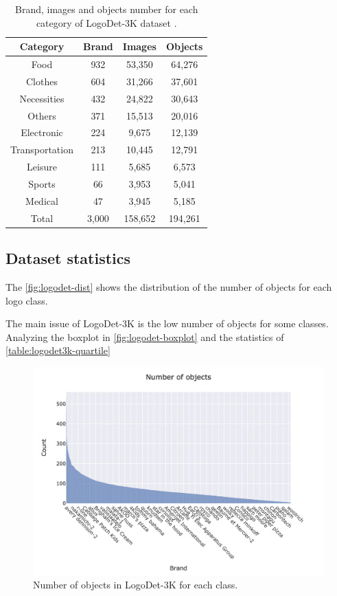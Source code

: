 \begin{table}
    \centering
    \begin{tabular}{c | c  c  c } 
     \hline
     \textbf{Category} & \textbf{Brand} & \textbf{Images} & \textbf{Objects} \\
     \hline
     Food & 932 & 53,350 & 64,276 \\ 
    Clothes & 604 & 31,266 & 37,601 \\ 
    Necessities & 432 & 24,822 & 30,643 \\ 
    Others & 371 & 15,513 & 20,016 \\ 
    Electronic & 224 & 9,675 & 12,139 \\ 
    Transportation & 213 & 10,445 & 12,791 \\ 
    Leisure & 111 & 5,685 & 6,573 \\ 
    Sports & 66 & 3,953 & 5,041 \\ 
    Medical & 47 & 3,945 & 5,185 \\ 
    \hline
    Total & 3,000 & 158,652 & 194,261 \\ 

    \end{tabular}
    \caption{Brand, images and objects number for each category of LogoDet-3K dataset \cite{wang2022logodet}.}
    \label{table:logodet3k-category-statistics}
\end{table}

\subsection{Dataset statistics}
The \autoref{fig:logodet-dist} shows the distribution of the number of objects for each logo class.

The main issue of LogoDet-3K is the low number of objects for some classes. Analyzing the boxplot in \autoref{fig:logodet-boxplot} and the statistics of \autoref{table:logodet3k-quartile}


\begin{figure}%
	\centering

    \begin{center}
        \includegraphics[width=\columnwidth]{images/freq.jpeg}
    \end{center}
	\caption{Number of objects in LogoDet-3K for each class.}%
	\label{fig:logodet-dist}%
\end{figure}


